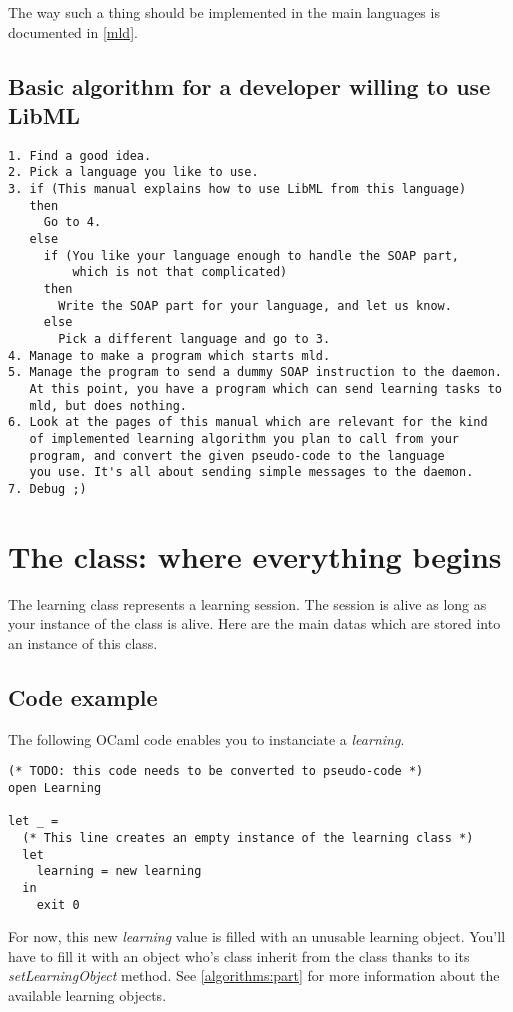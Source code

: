 \bigskip

The way such a thing should be implemented in the main languages is documented
in \vref{mld}.

\subsection{Basic algorithm for a developer willing to use LibML}
\begin{verbatim}
1. Find a good idea.
2. Pick a language you like to use.
3. if (This manual explains how to use LibML from this language)
   then
     Go to 4.
   else
     if (You like your language enough to handle the SOAP part,
         which is not that complicated)
     then
       Write the SOAP part for your language, and let us know.
     else
       Pick a different language and go to 3.
4. Manage to make a program which starts mld.
5. Manage the program to send a dummy SOAP instruction to the daemon.
   At this point, you have a program which can send learning tasks to
   mld, but does nothing.
6. Look at the pages of this manual which are relevant for the kind
   of implemented learning algorithm you plan to call from your
   program, and convert the given pseudo-code to the language
   you use. It's all about sending simple messages to the daemon.
7. Debug ;)
\end{verbatim}


\section{The \textit{} class: where everything begins}

The learning class represents a learning session. The session is alive as
long as your instance of the \textit{} class is alive. Here
are the main datas which are stored into an instance of this class.
\subsection{Code example}
The following OCaml code enables you to instanciate a \textit{learning}.
\begin{verbatim}
(* TODO: this code needs to be converted to pseudo-code *)
open Learning

let _ =
  (* This line creates an empty instance of the learning class *)
  let
    learning = new learning
  in
    exit 0
\end{verbatim}

For now, this new \textit{learning} value is filled with an unusable
learning object. You'll have to fill it with an object
who's class inherit from the \textit{} class thanks
to its \textit{setLearningObject} method. See \vref{algorithms:part} for
more information about the available learning objects. 

